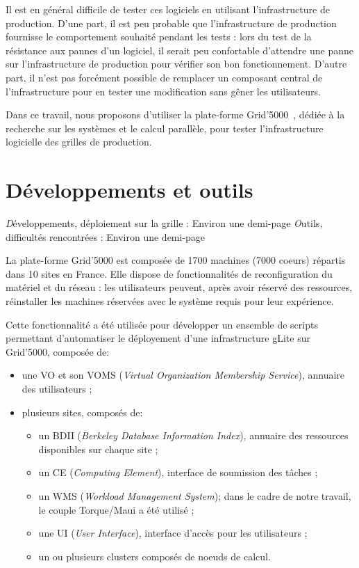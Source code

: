 \documentclass[a4paper,11pt]{article}
\newcommand{\todo}[1]{{\color{red}\textsl #1}}
\begin{document}
Il est en général difficile de tester ces logiciels en utilisant
l'infrastructure de production. D'une part, il est peu probable que
l'infrastructure de production fournisse le comportement souhaité pendant les
tests : lors du test de la résistance aux pannes d'un logiciel, il serait peu
confortable d'attendre une panne sur l'infrastructure de production pour
vérifier son bon fonctionnement. D'autre part, il n'est pas forcément possible
de remplacer un composant central de l'infrastructure pour en tester une
modification sans gêner les utilisateurs.

Dans ce travail, nous proposons d'utiliser la plate-forme
Grid'5000~\cite{grid5000,grid5000web}, dédiée à la recherche sur les systèmes
et le calcul parallèle, pour tester l'infrastructure logicielle des grilles de
production.

\section{Développements et outils}
\todo{Développements, déploiement sur la grille : Environ une demi-page}
\todo{Outils, difficultés rencontrées : Environ une demi-page}

La plate-forme Grid'5000 est composée de 1700 machines (7000 coeurs) répartis
dans 10 sites en France. Elle dispose de fonctionnalités de reconfiguration du
matériel et du réseau : les utilisateurs peuvent, après avoir réservé des
ressources, réinstaller les machines réservées avec le système requis pour leur
expérience.

Cette fonctionnalité a été utilisée pour développer un ensemble de scripts
permettant d'automatiser le déployement d'une infrastructure gLite sur
Grid'5000, composée de:

\begin{itemize}

\item une VO et son VOMS (\textsl{Virtual Organization Membership Service}),
	annuaire des utilisateurs ;

\item plusieurs sites, composés de:

\begin{itemize}

	\item un BDII (\textsl{Berkeley Database Information Index}), annuaire
		des ressources disponibles sur chaque site ;

	\item un CE (\textsl{Computing Element}), interface de soumission des
		tâches ;

	\item un WMS (\textsl{Workload Management System}); dans le cadre de
		notre travail, le couple Torque/Maui a été utilisé ;

	\item une UI (\textsl{User Interface}), interface d'accès pour les
		utilisateurs ;

	\item un ou plusieurs clusters composés de noeuds de calcul.

\end{itemize}
\end{itemize}
\end{document}
